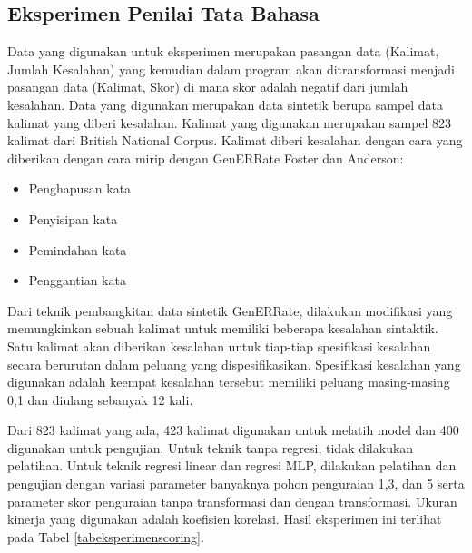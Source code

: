 \documentclass[conference]{IEEEtran}
\begin{document}
\subsection{Eksperimen Penilai Tata Bahasa}

Data yang digunakan untuk eksperimen merupakan pasangan data (Kalimat, Jumlah Kesalahan) yang kemudian dalam program akan ditransformasi menjadi pasangan data (Kalimat, Skor) di mana skor adalah negatif dari jumlah kesalahan. 
Data yang digunakan merupakan data sintetik berupa sampel data kalimat yang diberi kesalahan. Kalimat yang digunakan merupakan sampel 823 kalimat dari British National Corpus\cite{b9}. Kalimat diberi kesalahan dengan cara yang diberikan dengan cara mirip dengan GenERRate Foster dan Anderson\cite{b10}:
\begin{itemize}
\item Penghapusan kata
\item Penyisipan kata
\item Pemindahan kata
\item Penggantian kata
\end{itemize}
Dari teknik pembangkitan data sintetik GenERRate\cite{b10}, dilakukan modifikasi yang memungkinkan sebuah kalimat untuk memiliki beberapa kesalahan sintaktik. Satu kalimat akan diberikan kesalahan untuk tiap-tiap spesifikasi kesalahan secara berurutan dalam peluang yang dispesifikasikan. Spesifikasi kesalahan yang digunakan adalah keempat kesalahan tersebut memiliki peluang masing-masing 0,1 dan diulang sebanyak 12 kali.

Dari 823 kalimat yang ada, 423 kalimat digunakan untuk melatih model dan 400 digunakan untuk pengujian. Untuk teknik tanpa regresi, tidak dilakukan pelatihan. Untuk teknik regresi linear dan regresi MLP, dilakukan pelatihan dan pengujian dengan variasi parameter banyaknya pohon penguraian 1,3, dan 5 serta parameter skor penguraian tanpa transformasi dan dengan transformasi. Ukuran kinerja yang digunakan adalah koefisien korelasi. Hasil eksperimen ini terlihat pada Tabel \ref{tabeksperimenscoring}.
\end{document}
